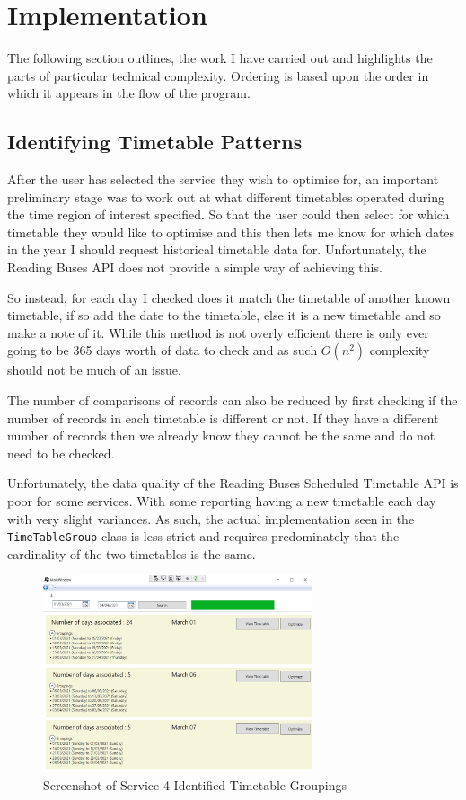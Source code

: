 \documentclass{article}
\begin{document}
\section{Implementation}
The following section outlines, the work I have carried out and highlights the parts of particular technical complexity. Ordering is based upon the order in which it appears in the flow of the program.



\subsection{Identifying Timetable Patterns}
\label{timetablePatterens}
After the user has selected the service they wish to optimise for, an important preliminary stage was to work out at what different timetables operated during the time region of interest specified. So that the user could then select for which timetable they would like to optimise and  this then lets me know for which dates in the year I should request historical timetable data for. Unfortunately, the Reading Buses API does not provide a simple way of achieving this.


\par
So instead, for each day I checked does it match the timetable of another known timetable, if so add the date to the timetable, else it is a new timetable and so make a note of it. While this method is not overly efficient there is only ever going to be 365 days worth of data to check and as such $O(n^2)$ complexity should not be much of an issue. 

\par 
The number of comparisons of records can also be reduced by first checking if the number of records in each timetable is different or not. If they have a different number of records then we already know they cannot be the same and do not need to be checked.

\par 
Unfortunately, the data quality of the Reading Buses Scheduled Timetable API is poor for some services. With some reporting having a new timetable each day with very slight variances. As such, the actual implementation seen in the \texttt{TimeTableGroup} class is less strict and requires predominately that the cardinality of the two timetables is the same. 

\begin{figure}[H]
	\centering
	\includegraphics[width=300px]{images/grouping.png}
	\caption{Screenshot of Service 4 Identified Timetable Groupings}
	\label{fig:grouping}
\end{figure}
\end{document}
